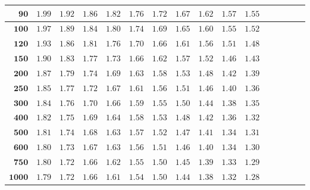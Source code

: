 \begin{customTableWrapper}{1.4}
\begin{longtable}{|r|r|r|r|r|r|r|r|r|r|r|r|r|r|r|r|}
    ${\mathbf{90}}$  & ${1.99}$   & ${1.92}$   & ${1.86}$   & ${1.82}$   & ${1.76}$   & ${1.72}$   & ${1.67}$   & ${1.62}$   & ${1.57}$   & ${1.55}$   \\  \hline 
    ${\mathbf{100}}$  & ${1.97}$   & ${1.89}$   & ${1.84}$   & ${1.80}$   & ${1.74}$   & ${1.69}$   & ${1.65}$   & ${1.60}$   & ${1.55}$   & ${1.52}$   \\  \hline 
    ${\mathbf{120}}$  & ${1.93}$   & ${1.86}$   & ${1.81}$   & ${1.76}$   & ${1.70}$   & ${1.66}$   & ${1.61}$   & ${1.56}$   & ${1.51}$   & ${1.48}$   \\  \hline 
    ${\mathbf{150}}$  & ${1.90}$   & ${1.83}$   & ${1.77}$   & ${1.73}$   & ${1.66}$   & ${1.62}$   & ${1.57}$   & ${1.52}$   & ${1.46}$   & ${1.43}$   \\  \hline 
    ${\mathbf{200}}$  & ${1.87}$   & ${1.79}$   & ${1.74}$   & ${1.69}$   & ${1.63}$   & ${1.58}$   & ${1.53}$   & ${1.48}$   & ${1.42}$   & ${1.39}$   \\  \hline 
    ${\mathbf{250}}$  & ${1.85}$   & ${1.77}$   & ${1.72}$   & ${1.67}$   & ${1.61}$   & ${1.56}$   & ${1.51}$   & ${1.46}$   & ${1.40}$   & ${1.36}$   \\  \hline 
    ${\mathbf{300}}$  & ${1.84}$   & ${1.76}$   & ${1.70}$   & ${1.66}$   & ${1.59}$   & ${1.55}$   & ${1.50}$   & ${1.44}$   & ${1.38}$   & ${1.35}$   \\  \hline 
    ${\mathbf{400}}$  & ${1.82}$   & ${1.75}$   & ${1.69}$   & ${1.64}$   & ${1.58}$   & ${1.53}$   & ${1.48}$   & ${1.42}$   & ${1.36}$   & ${1.32}$   \\  \hline 
    ${\mathbf{500}}$  & ${1.81}$   & ${1.74}$   & ${1.68}$   & ${1.63}$   & ${1.57}$   & ${1.52}$   & ${1.47}$   & ${1.41}$   & ${1.34}$   & ${1.31}$   \\  \hline 
    ${\mathbf{600}}$  & ${1.80}$   & ${1.73}$   & ${1.67}$   & ${1.63}$   & ${1.56}$   & ${1.51}$   & ${1.46}$   & ${1.40}$   & ${1.34}$   & ${1.30}$   \\  \hline 
    ${\mathbf{750}}$  & ${1.80}$   & ${1.72}$   & ${1.66}$   & ${1.62}$   & ${1.55}$   & ${1.50}$   & ${1.45}$   & ${1.39}$   & ${1.33}$   & ${1.29}$   \\  \hline 
    ${\mathbf{1000}}$  & ${1.79}$   & ${1.72}$   & ${1.66}$   & ${1.61}$   & ${1.54}$   & ${1.50}$   & ${1.44}$   & ${1.38}$   & ${1.32}$   & ${1.28}$   \\ \hline

\end{longtable}
\end{customTableWrapper}
\changefontsizes{11pt}


